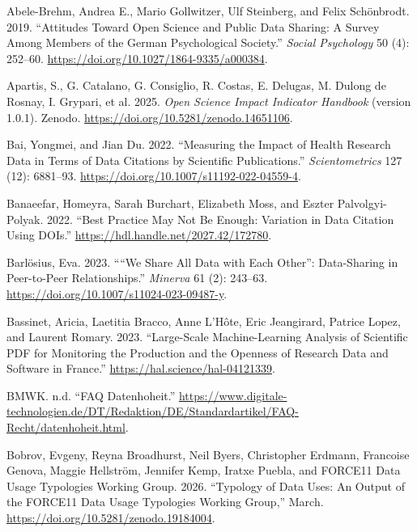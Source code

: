 \documentclass[
  letterpaper,
  DIV=11,
  numbers=noendperiod]{scrartcl}
\newlength{\cslhangindent}
\newenvironment{CSLReferences}[2] %
 {\begin{list}{}{%
  \setlength{\itemindent}{0pt}
  \setlength{\leftmargin}{0pt}
  \setlength{\parsep}{0pt}
  \ifodd #1
   \setlength{\leftmargin}{\cslhangindent}
   \setlength{\itemindent}{-1\cslhangindent}
  \fi
  \setlength{\itemsep}{#2\baselineskip}}}
 {\end{list}}
\begin{document}
\label{refs}
\begin{CSLReferences}{1}{0}
Abele-Brehm, Andrea E., Mario Gollwitzer, Ulf Steinberg, and Felix
Schönbrodt. 2019. {``Attitudes {Toward Open Science} and {Public Data
Sharing}: {A Survey Among Members} of the {German Psychological
Society}.''} \emph{Social Psychology} 50 (4): 252--60.
\url{https://doi.org/10.1027/1864-9335/a000384}.

Apartis, S., G. Catalano, G. Consiglio, R. Costas, E. Delugas, M. Dulong
de Rosnay, I. Grypari, et al. 2025. \emph{Open {Science Impact Indicator
Handbook}} (version 1.0.1). Zenodo.
\url{https://doi.org/10.5281/zenodo.14651106}.

Bai, Yongmei, and Jian Du. 2022. {``Measuring the Impact of Health
Research Data in Terms of Data Citations by Scientific Publications.''}
\emph{Scientometrics} 127 (12): 6881--93.
\url{https://doi.org/10.1007/s11192-022-04559-4}.

Banaeefar, Homeyra, Sarah Burchart, Elizabeth Moss, and Eszter
Palvolgyi-Polyak. 2022. {``Best {Practice May Not Be Enough}:
{Variation} in {Data Citation Using DOIs}.''}
\url{https://hdl.handle.net/2027.42/172780}.

Barlösius, Eva. 2023. {``{``}We Share All Data with Each Other{''}:
Data-Sharing in Peer-to-Peer Relationships.''} \emph{Minerva} 61 (2):
243--63. \url{https://doi.org/10.1007/s11024-023-09487-y}.

Bassinet, Aricia, Laetitia Bracco, Anne L'Hôte, Eric Jeangirard, Patrice
Lopez, and Laurent Romary. 2023. {``Large-Scale {Machine-Learning}
Analysis of Scientific {PDF} for Monitoring the Production and the
Openness of Research Data and Software in {France}.''}
\url{https://hal.science/hal-04121339}.

BMWK. n.d. {``FAQ Datenhoheit.''}
\url{https://www.digitale-technologien.de/DT/Redaktion/DE/Standardartikel/FAQ-Recht/datenhoheit.html}.

Bobrov, Evgeny, Reyna Broadhurst, Neil Byers, Christopher Erdmann,
Francoise Genova, Maggie Hellström, Jennifer Kemp, Iratxe Puebla, and
FORCE11 Data Usage Typologies Working Group. 2026. {``Typology of {Data
Uses}: {An} Output of the {FORCE11 Data Usage Typologies Working
Group},''} March. \url{https://doi.org/10.5281/zenodo.19184004}.


\end{CSLReferences}
\end{document}
